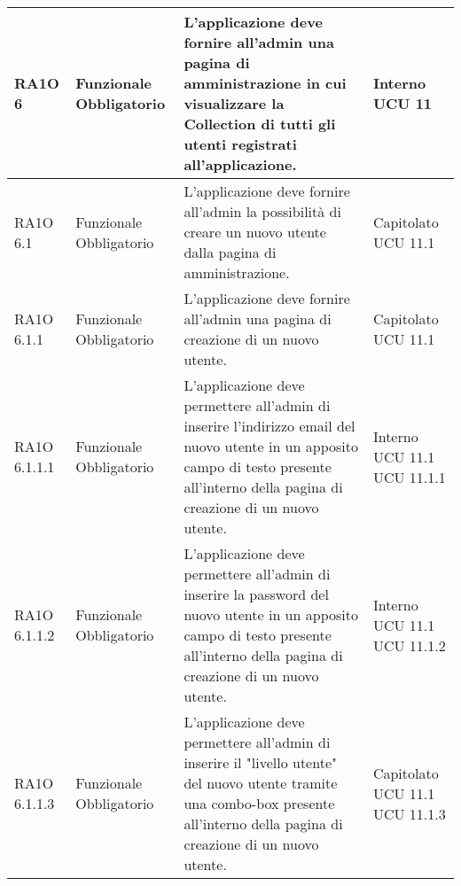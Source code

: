 \begin{center}
\begin{longtable}{ | l | p{2cm} | p{5cm} | p{1.7cm} |}
        RA1O 6 & Funzionale \newline  Obbligatorio  & L'applicazione deve fornire all'admin una pagina di amministrazione in cui visualizzare la Collection di tutti gli utenti registrati all'applicazione. &  Interno \newline  UCU 11 \newline  \\ \hline      
        RA1O 6.1 & Funzionale \newline  Obbligatorio  & L'applicazione deve fornire all'admin la possibilità  di creare un nuovo utente dalla pagina di amministrazione. &  Capitolato \newline  UCU 11.1 \newline  \\ \hline      
        RA1O 6.1.1 & Funzionale \newline  Obbligatorio  & L'applicazione deve fornire all'admin una pagina di creazione di un nuovo utente. &  Capitolato \newline  UCU 11.1 \newline  \\ \hline      
        RA1O 6.1.1.1 & Funzionale \newline  Obbligatorio  & L'applicazione deve permettere all'admin di inserire l'indirizzo email del nuovo utente in un apposito campo di testo presente all'interno della pagina di creazione di un nuovo utente.
 &  Interno \newline  UCU 11.1 \newline  UCU 11.1.1 \newline  \\ \hline      
        RA1O 6.1.1.2 & Funzionale \newline  Obbligatorio  & L'applicazione deve permettere all'admin di inserire la password del nuovo utente in un apposito campo di testo presente all'interno della pagina di creazione di un nuovo utente. &  Interno \newline  UCU 11.1 \newline  UCU 11.1.2 \newline  \\ \hline      
        RA1O 6.1.1.3 & Funzionale \newline  Obbligatorio  & L'applicazione deve permettere all'admin di inserire il "livello utente" del nuovo utente tramite una combo-box presente all'interno della pagina di creazione di un nuovo utente. &  Capitolato \newline  UCU 11.1 \newline  UCU 11.1.3 \newline  \\ \hline      

\end{longtable}
\end{center}
